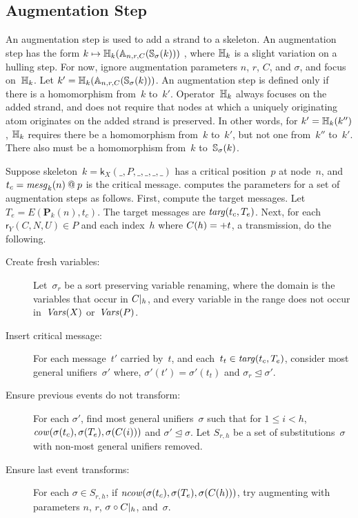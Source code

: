 \documentclass[12pt]{article}
\theoremstyle{definition}
\newcommand{\pubmsg}{\mathbf{P}}
\newcommand{\mcow}{\fn{cow}}
\newcommand{\mncow}{\fn{ncow}}
\newcommand{\svars}{\fn{Vars}}
\newcommand{\mesg}{\fn{mesg}}
\newcommand{\role}{\mathsf{r}}
\newcommand{\skel}{\mathsf{k}}
\begin{document}
\subsection{Augmentation Step}\label{sec:aug step}

An augmentation step is used to add a strand to a skeleton.  An
augmentation step has the form
$k\mapsto\mathbb H_k(\mathbb A_{n,r,C}(\mathbb S_\sigma(k)))$ , where
$\mathbb H_k$ is a slight variation on a hulling step.  For now, ignore
augmentation parameters $n$, $r$, $C$, and $\sigma$, and focus
on~$\mathbb H_k$.  Let
$k'=\mathbb H_k(\mathbb A_{n,r,C}(\mathbb S_\sigma(k)))$.  An augmentation
step is defined only if there is a homomorphism from~$k$ to~$k'$.
Operator~$\mathbb H_k$ always focuses on the added strand, and does not
require that nodes at which a uniquely originating atom originates on
the added strand is preserved.  In other words, for
$k'=\mathbb H_k(k'')$, $\mathbb H_k$ requires there be a homomorphism
from~$k$ to~$k'$, but not one from~$k''$ to~$k'$.  There also must be a
homomorphism from~$k$ to~$\mathbb S_\sigma(k)$.

Suppose skeleton~$k=\skel_X(\_,P,\_,\_,\_,\_)$ has a critical
position~$p$ at node~$n$, and $t_c=\mesg_k(n)\termat p$ is the
critical message.  {\cpsa} computes the parameters for a set of
augmentation steps as follows.  First, compute the target messages.
Let $T_e=E(\pubmsg_k(n), t_c)$.  The target messages are $\operatorname{\mathit{targ}}(t_c, T_e)$.
Next, for each $\role_Y(C,N,U)\in
P$ and each index~$h$ where $C(h)=\mathord + t$, a transmission, do the
following.
\begin{description}
\item[Create fresh variables:]
Let~$\sigma_r$ be a sort preserving variable renaming,
where the domain is the variables that occur in $C|_{h}$, and every
variable in the range does not occur in~$\svars(X)$ or~$\svars(P)$.

\item[Insert critical message:] For each message~$t'$ carried by~$t$,
  and each~$t_t\in \operatorname{\mathit{targ}}(t_c, T_e)$, consider most general unifiers~$\sigma'$
  where, $\sigma'(t')=\sigma'(t_t)$ and $\sigma_r\unlhd\sigma'$.

\item[Ensure previous events do not transform:] For each $\sigma'$, find
  most general unifiers~$\sigma$ such that for $1\leq i<h$,
  $\mcow(\sigma(t_c), \sigma(T_e), \sigma(C(i)))$ and
  $\sigma'\unlhd\sigma$.  Let $S_{r,h}$ be a set of
  substitutions~$\sigma$ with non-most general unifiers removed.

\item[Ensure last event transforms:] For each $\sigma\in S_{r,h}$,
if $\mncow(\sigma(t_c),\sigma(T_e),\sigma(C(h)))$, try
augmenting with parameters $n$, $r$, $\sigma\circ C|_{h}$,
and~$\sigma$.
\end{description}
\end{document}
